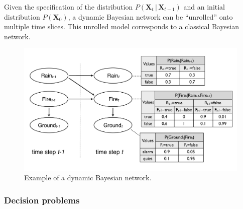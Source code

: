Given the specification of the distribution $P(\mathbf{X}_t  \, | \,  \mathbf{X}_{t\!-\!1})$ and an initial distribution $P(\mathbf{X}_0)$, a dynamic Bayesian network can be ``unrolled'' onto multiple time slices.  This unrolled model corresponds to a classical Bayesian network.  

\begin{figure}[h]
\centering
\includegraphics[scale=0.25]{imgs/dbn.pdf}
\caption{Example of a dynamic Bayesian network. }
\label{fig:dbn}
\end{figure}



\subsubsection*{Decision problems}

